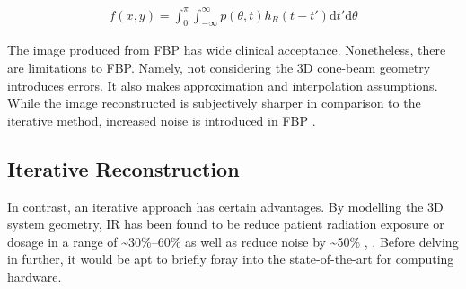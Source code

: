 \documentclass{bmcart}
\begin{document}
\begin{ceqn}
\begin{align}
        f(x,y)=\int_{0}^{\pi} \int_{-\infty}^{\infty} p(\theta,t)h_R(t-t') \mathrm{d}t' \mathrm{d}\theta
\end{align}
\end{ceqn}
The image produced from FBP has wide clinical acceptance. Nonetheless, there are limitations to FBP. Namely, not considering the 3D cone-beam geometry introduces errors. It also makes approximation and interpolation assumptions. While the image reconstructed is subjectively sharper in comparison to the iterative method, increased noise is introduced in FBP \cite{geyer_state_2015}. 

\subsection*{Iterative Reconstruction}
In contrast, an iterative approach has certain advantages. By modelling the 3D system geometry, IR has been found to be reduce patient radiation exposure or dosage in a range of \textasciitilde{}30\%--60\% as well as reduce noise by \textasciitilde{}50\% \cite{patino_iterative_2015}, \cite{beister_iterative_2012}. Before delving in further, it would be apt to briefly foray into the state-of-the-art for computing hardware.
\end{document}
